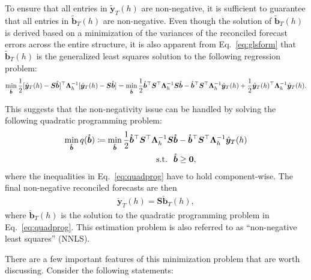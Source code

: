 \documentclass[11pt]{article}
\newcommand{\0}{\phantom{0}}
\begin{document}
To ensure that all entries in $\tilde{\bm{y}}_{T}(h)$ are non-negative, it is sufficient to guarantee that all entries in $\tilde{\bm{b}}_{T}(h)$ are non-negative. Even though the solution of $\tilde{\bm{b}}_{T}(h)$ is derived based on a minimization of the variances of the reconciled forecast errors across the entire structure, it is also apparent from Eq.~\eqref{eq:glsform} that $\tilde{\bm{b}}_{T}(h)$ is the generalized least squares solution to the following regression problem:
\begin{align*}
	\operatornamewithlimits{min}_{\mathring{\bm{b}}} \frac{1}{2}[\hat{\bm{y}}_{T}(h) - \bm{S}\mathring{\bm{b}}]^\top\bm{\Lambda}^{-1}_{h}[\hat{\bm{y}}_{T}(h) - \bm{S}\mathring{\bm{b}}] =  \operatornamewithlimits{min}_{\mathring{\bm{b}}} \frac{1}{2}\mathring{\bm{b}}^\top\bm{S}^\top\bm{\Lambda}^{-1}_{h}\bm{S}\mathring{\bm{b}} - \mathring{\bm{b}}^\top\bm{S}^\top\bm{\Lambda}^{-1}_{h}\hat{\bm{y}}_{T}(h) +  \frac{1}{2}\hat{\bm{y}}_{T}(h)^\top \bm{\Lambda}_{h}^{-1}\hat{\bm{y}}_{T}(h).
\end{align*}

This suggests that the non-negativity issue can be handled by solving the following quadratic programming problem:
\begin{align}
	\label{eq:quadprog}
	\operatornamewithlimits{min}_{\mathring{\bm{b}}} q(\mathring{\bm{b}}) \coloneqq \operatornamewithlimits{min}_{\mathring{\bm{b}}} \frac{1}{2}\mathring{\bm{b}}^\top\bm{S}^\top\bm{\Lambda}^{-1}_{h}\bm{S}\mathring{\bm{b}} & - \mathring{\bm{b}}^\top\bm{S}^\top\bm{\Lambda}^{-1}_{h}\hat{\bm{y}}_{T}(h) \nonumber \\
	\text{s.t.} \hspace*{2.5mm} \mathring{\bm{b}}                                                                                                                                                             & \geq \bm{0},
\end{align}
where the inequalities in Eq.~\eqref{eq:quadprog} have to hold component-wise. The final non-negative reconciled forecasts are then
\begin{align*}
	\breve{\bm{y}}_{T}(h) = \bm{S}\breve{\bm{b}}_{T}(h),
\end{align*}
where $\breve{\bm{b}}_{T}(h)$ is the solution to the quadratic programming problem in Eq.~\eqref{eq:quadprog}. This estimation problem is also referred to as ``non-negative least squares'' (NNLS).

There are a few important features of this minimization problem that are worth discussing. Consider the following statements:
\end{document}
